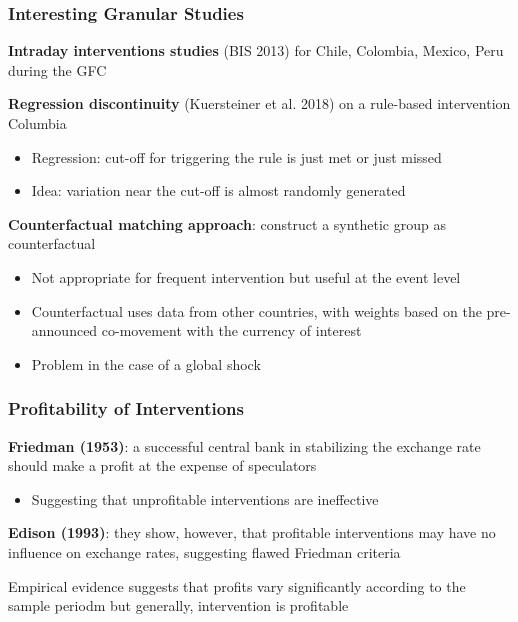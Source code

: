 \documentclass{beamer}
\newenvironment{wideitemize}{\itemize\addtolength{\itemsep}{10pt}}{\enditemize}
\begin{document}
\begin{frame}
  \frametitle{Interesting Granular Studies}
  \begin{wideitemize}
  \item \textbf{Intraday interventions studies} (BIS 2013) for Chile, Colombia, Mexico, Peru during the GFC
  \item \textbf{Regression discontinuity} (Kuersteiner et al. 2018) on a rule-based intervention Columbia
    \begin{itemize}
    \item Regression: cut-off for triggering the rule is just met or just missed
    \item Idea: variation near the cut-off is almost randomly generated
    \end{itemize}
  \item \textbf{Counterfactual matching approach}: construct a synthetic group as counterfactual
    \begin{itemize}
    \item Not appropriate for frequent intervention but useful at the event level
    \item Counterfactual uses data from other countries, with weights based on the pre-announced co-movement with the currency of interest
    \item Problem in the case of a global shock
    \end{itemize}
    
  \end{wideitemize}
\end{frame}


\begin{frame}
  \frametitle{Profitability of Interventions}
  \begin{wideitemize}
  \item \textbf{Friedman (1953)}: a successful central bank in stabilizing the exchange rate should make a profit at the expense of speculators
    \begin{itemize}
    \item Suggesting that unprofitable interventions are ineffective
    \end{itemize}
  \item \textbf{Edison (1993)}: they show, however, that profitable interventions may have no influence on exchange rates, suggesting flawed Friedman criteria
  \item Empirical evidence suggests that profits vary significantly according to the sample periodm but generally, intervention is profitable
  \end{wideitemize}  
\end{frame}
\end{document}
